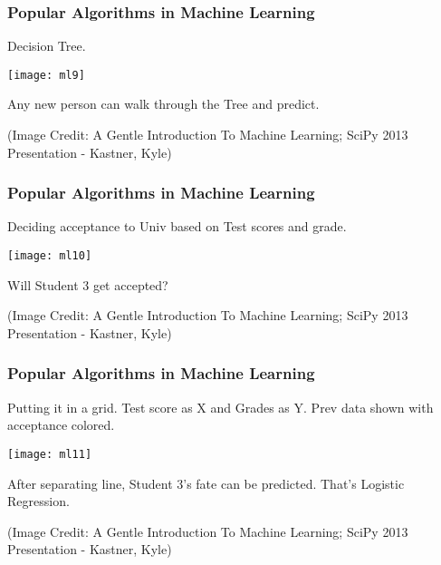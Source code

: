 \begin{frame}[fragile]\frametitle{Popular Algorithms in Machine Learning}
Decision Tree.
\begin{center}
\texttt{[image: ml9]}
\end{center}
Any new person can walk through the Tree and predict.

\tiny{(Image Credit: A Gentle Introduction To Machine Learning; SciPy 2013 Presentation - Kastner, Kyle)}
\end{frame}


\begin{frame}[fragile]\frametitle{Popular Algorithms in Machine Learning}
Deciding acceptance to Univ based on Test scores and grade.
\begin{center}
\texttt{[image: ml10]}
\end{center}
Will Student 3 get accepted?

\tiny{(Image Credit: A Gentle Introduction To Machine Learning; SciPy 2013 Presentation - Kastner, Kyle)}
\end{frame}


\begin{frame}[fragile]\frametitle{Popular Algorithms in Machine Learning}
Putting it in a grid. Test score as X and Grades as Y. Prev data shown with acceptance colored.
\begin{center}
\texttt{[image: ml11]}
\end{center}
After separating line, Student 3's fate can be predicted. That's Logistic Regression.

\tiny{(Image Credit: A Gentle Introduction To Machine Learning; SciPy 2013 Presentation - Kastner, Kyle)}
\end{frame}

